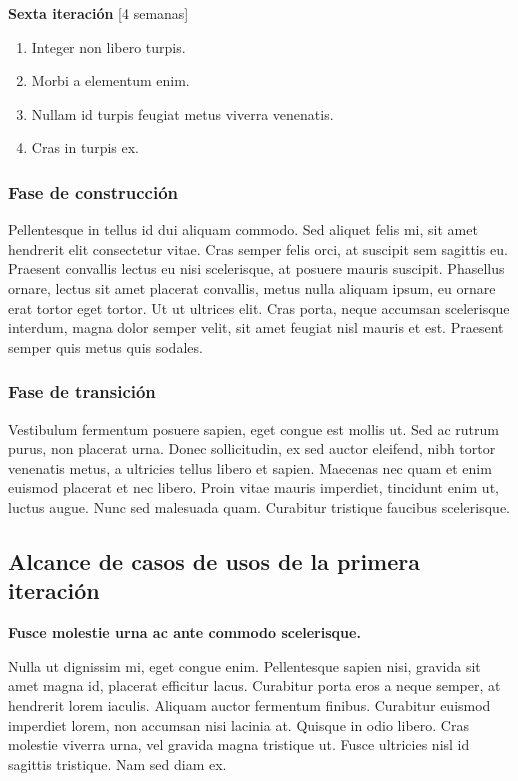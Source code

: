 \documentclass[a4paper, 10pt, twoside]{article}
\begin{document}
\textbf{Sexta iteración} [4 semanas]
\begin{enumerate}
\item Integer non libero turpis.
\item Morbi a elementum enim.
\item Nullam id turpis feugiat metus viverra venenatis.
\item Cras in turpis ex.
\end{enumerate}

\subsubsection{Fase de construcción}
Pellentesque in tellus id dui aliquam commodo. Sed aliquet felis mi, sit amet hendrerit elit consectetur vitae. Cras semper felis orci, at suscipit sem sagittis eu. Praesent convallis lectus eu nisi scelerisque, at posuere mauris suscipit. Phasellus ornare, lectus sit amet placerat convallis, metus nulla aliquam ipsum, eu ornare erat tortor eget tortor. Ut ut ultrices elit. Cras porta, neque accumsan scelerisque interdum, magna dolor semper velit, sit amet feugiat nisl mauris et est. Praesent semper quis metus quis sodales.

\subsubsection{Fase de transición}
Vestibulum fermentum posuere sapien, eget congue est mollis ut. Sed ac rutrum purus, non placerat urna. Donec sollicitudin, ex sed auctor eleifend, nibh tortor venenatis metus, a ultricies tellus libero et sapien. Maecenas nec quam et enim euismod placerat et nec libero. Proin vitae mauris imperdiet, tincidunt enim ut, luctus augue. Nunc sed malesuada quam. Curabitur tristique faucibus scelerisque.

\subsection{Alcance de casos de usos de la primera iteración}
\textbf{Fusce molestie urna ac ante commodo scelerisque.}

Nulla ut dignissim mi, eget congue enim. Pellentesque sapien nisi, gravida sit amet magna id, placerat efficitur lacus. Curabitur porta eros a neque semper, at hendrerit lorem iaculis. Aliquam auctor fermentum finibus. Curabitur euismod imperdiet lorem, non accumsan nisi lacinia at. Quisque in odio libero. Cras molestie viverra urna, vel gravida magna tristique ut. Fusce ultricies nisl id sagittis tristique. Nam sed diam ex.
\end{document}
